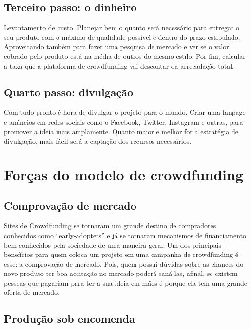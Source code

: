 \documentclass{classe_cn}                 %
\begin{document}
\subsection{Terceiro passo: o dinheiro}

Levantamento de custo. Planejar bem o quanto será necessário para entregar o seu produto com o máximo de qualidade possível e dentro do prazo estipulado. Aproveitando também para fazer uma pesquisa de mercado e ver se o valor cobrado pelo produto está na média de outros do mesmo estilo. Por fim, calcular a taxa que a plataforma de crowdfunding vai descontar da arrecadação total.

\subsection{Quarto passo: divulgação}

Com tudo pronto é hora de divulgar o projeto para o mundo. Criar uma fanpage e anúncios em redes sociais como o Facebook, Twitter, Instagram e outras, para promover a ideia mais amplamente. Quanto maior e melhor for a estratégia de divulgação, mais fácil será a captação dos recursos necessários.

\section{Forças do modelo de crowdfunding}

\subsection{Comprovação de mercado}

Sites de Crowdfunding se tornaram um grande destino de compradores conhecidos como “early-adopters” e já se tornaram mecanismos de financiamento bem conhecidos pela sociedade de uma maneira geral. Um dos principais benefícios para quem coloca um projeto em uma campanha de crowdfunding é esse: a comprovação de mercado. Pois, quem possui dúvidas sobre as chances do novo produto ter boa aceitação no mercado poderá saná-las, afinal, se existem pessoas que pagariam para ter a sua ideia em mãos é porque ela tem uma grande oferta de mercado.

\subsection{Produção sob encomenda}
\end{document}
